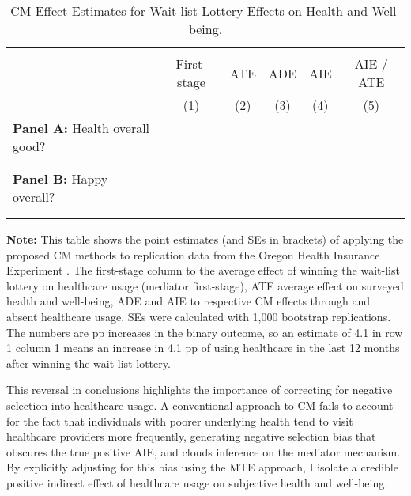 \begin{table}[h!]
    \singlespacing
    \centering
    \small
    \caption{CM Effect Estimates for Wait-list Lottery Effects on Health and Well-being.}
    \begin{tabular}{l c c c c c}
        \\[-1.8ex]\hline \hline \\[-1.8ex] 
        & First-stage & ATE & ADE & AIE & AIE / ATE \\
        \cmidrule(lr){2-6}
        & (1) & (2) & (3) & (4) & (5) \\
        \midrule
        \multicolumn{1}{l}{\textbf{Panel A:} Health overall good?} \\
        
        \\[-1.8ex]\hline \\[-1.8ex]
        \multicolumn{1}{l}{\textbf{Panel B:} Happy overall?} \\
        
        \\[-1.8ex]\hline \\[-1.8ex]
    \end{tabular}
    \vspace{-0.125cm}
    \label{tab:cm-oregon}
    \justify
    \footnotesize
    \textbf{Note:}
    This table shows the point estimates (and SEs in brackets) of applying the proposed CM methods to replication data from the Oregon Health Insurance Experiment \citep{icspr2014oregon}.
    The first-stage column to the average effect of winning the wait-list lottery on healthcare usage (mediator first-stage), ATE average effect on surveyed health and well-being, ADE and AIE to respective CM effects through and absent healthcare usage.
    SEs were calculated with 1,000 bootstrap replications.
    The numbers are pp increases in the binary outcome, so an estimate of 4.1 in row 1 column 1 means an increase in 4.1 pp of using healthcare in the last 12 months after winning the wait-list lottery.
\end{table}

This reversal in conclusions highlights the importance of correcting for negative selection into healthcare usage.
A conventional approach to CM fails to account for the fact that individuals with poorer underlying health tend to visit healthcare providers more frequently, generating negative selection bias that obscures the true positive AIE, and clouds inference on the mediator mechanism.
By explicitly adjusting for this bias using the MTE approach, I isolate a credible positive indirect effect of healthcare usage on subjective health and well-being.

